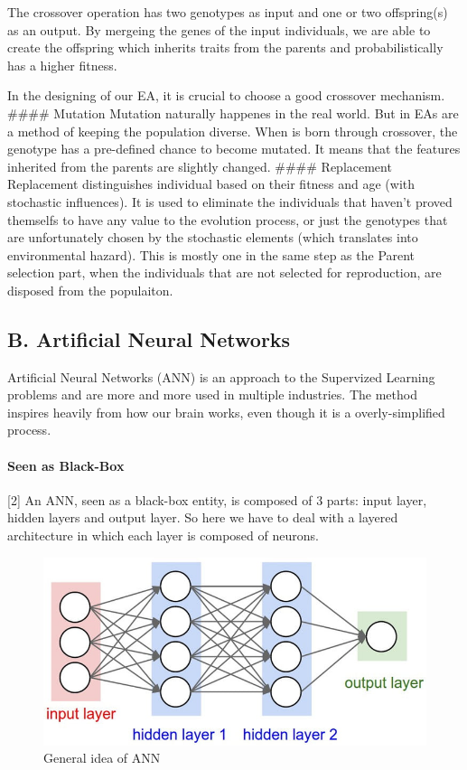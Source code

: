\documentclass[11pt]{article}
\makeatletter
\def\maxwidth{\ifdim\Gin@nat@width>\linewidth\linewidth
    \else\Gin@nat@width\fi}
\let\Oldincludegraphics\includegraphics
\renewcommand{\includegraphics}[1]{\Oldincludegraphics[width=.8\maxwidth]{#1}}
\makeatother
\begin{document}
The crossover operation has two genotypes as input and one or two
offspring(s) as an output. By mergeing the genes of the input
individuals, we are able to create the offspring which inherits traits
from the parents and probabilistically has a higher fitness.

In the designing of our EA, it is crucial to choose a good crossover
mechanism. \#\#\#\# Mutation Mutation naturally happenes in the real
world. But in EAs are a method of keeping the population diverse. When
is born through crossover, the genotype has a pre-defined chance to
become mutated. It means that the features inherited from the parents
are slightly changed. \#\#\#\# Replacement Replacement distinguishes
individual based on their fitness and age (with stochastic influences).
It is used to eliminate the individuals that haven't proved themselfs to
have any value to the evolution process, or just the genotypes that are
unfortunately chosen by the stochastic elements (which translates into
environmental hazard). This is mostly one in the same step as the Parent
selection part, when the individuals that are not selected for
reproduction, are disposed from the populaiton.

    \hypertarget{b.-artificial-neural-networks}{%
\subsection{B. Artificial Neural
Networks}\label{b.-artificial-neural-networks}}

Artificial Neural Networks (ANN) is an approach to the Supervized
Learning problems and are more and more used in multiple industries. The
method inspires heavily from how our brain works, even though it is a
overly-simplified process.

\hypertarget{seen-as-black-box}{%
\paragraph{Seen as Black-Box}\label{seen-as-black-box}}

{[}2{]} An ANN, seen as a black-box entity, is composed of 3 parts:
input layer, hidden layers and output layer. So here we have to deal
with a layered architecture in which each layer is composed of neurons.

\begin{figure}
\centering
\includegraphics{gfx/ann.jpg}
\caption{General idea of ANN}
\end{figure}
\end{document}
